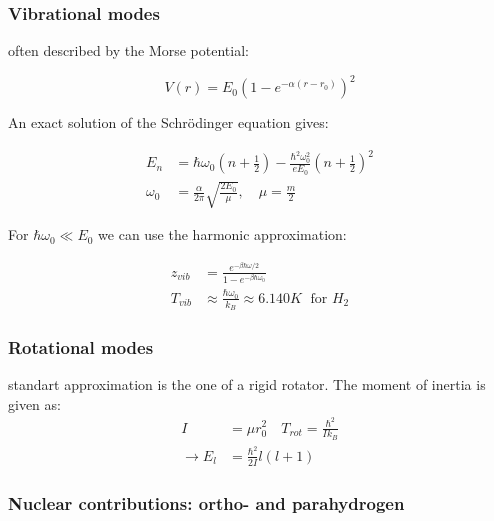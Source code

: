 \subsubsection*{Vibrational modes}
often described by the Morse potential:

\begin{equation*}
    V(r) = E_0 \left(1- e^{-\alpha (r-r_0)}\right)^2
\end{equation*}

An exact solution of the Schrödinger equation gives:

\begin{equation*}
    \begin{aligned}
        E_n &= \hbar \omega_0 \left(n + \frac{1}{2}\right) - \frac{\hbar^2 \omega_0^2}{e E_0} \left(n + \frac{1}{2}\right)^2 \\
        \omega_0 &= \frac{\alpha}{2 \pi} \sqrt{\frac{2 E_0}{\mu}} , \quad \mu = \frac{m}{2}
    \end{aligned}
\end{equation*}

For $\hbar \omega_0 \ll E_0 $ we can use the harmonic approximation:

\begin{equation*}
    \begin{aligned}
        z_{vib} &= \frac{e^{-\beta \hbar \omega /2}}{1- e^{- \beta \hbar \omega_0}}\\
        T_{vib} &\approx \frac{\hbar \omega_0}{k_B} \approx 6.140 K \; \text{ for } H_2
    \end{aligned}
\end{equation*}

\subsubsection*{Rotational modes}

standart approximation is the one of a rigid rotator. The moment of inertia is given as:
\begin{equation*}
    \begin{aligned}
        I &= \mu r_0^2 \quad T_{rot} = \frac{\hbar^2}{I k_B}\\
        \rightarrow E_l &= \frac{\hbar^2}{2I} l(l+1)
    \end{aligned}
\end{equation*}

\subsubsection*{Nuclear contributions: ortho- and parahydrogen}

